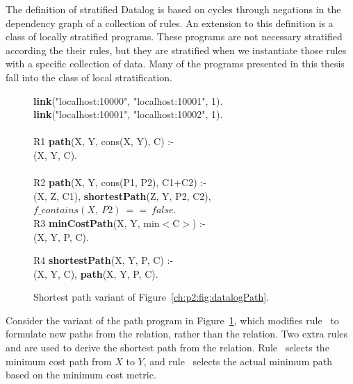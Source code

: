 The definition of stratified Datalog is based on cycles through negations in
the dependency graph of a collection of rules.  An extension to this definition
is a class of locally stratified programs.  These programs are not necessary
stratified according the their rules, but they are stratified when we
instantiate those rules with a specific collection of data.  Many of the
programs presented in this thesis fall into the class of local stratification.

\begin{figure}
\ssp
\begin{boxedminipage}{\linewidth}
{\bf link}("localhost:10000", "localhost:10001", 1). \\
{\bf link}("localhost:10001", "localhost:10002", 1). \\
\\
R1 {\bf path}(X, Y, cons(X, Y), C) :- \\
(X, Y, C). \\
\\       
R2 {\bf path}(X, Y, cons(P1, P2), C1+C2) :- \\
(X, Z, C1), {\bf shortestPath}(Z, Y, P2, C2), \\
\datalogspace $f\_contains(X,\ P2)\ ==\ false$. \\ 

R3 {\bf minCostPath}(X, Y, min$<$C$>$) :-  \\
(X, Y, P, C).

R4 {\bf shortestPath}(X, Y, P, C) :- \\
(X, Y, C), {\bf path}(X, Y, P, C).\\

\end{boxedminipage}
\caption{\label{ch:p2:fig:datalogSP}Shortest path variant of Figure~\ref{ch:p2:fig:datalogPath}.}
\end{figure}

Consider the variant of the path program in Figure~\ref{ch:p2:fig:datalogSP},
which modifies rule~ to formulate new paths from the  
relation, rather than the  relation.  Two extra rules  and  are used to
derive the shortest path from the  relation.  Rule~ selects the
minimum cost path from $X$ to $Y$, and rule~ selects the actual minimum
path based on the minimum cost metric.

